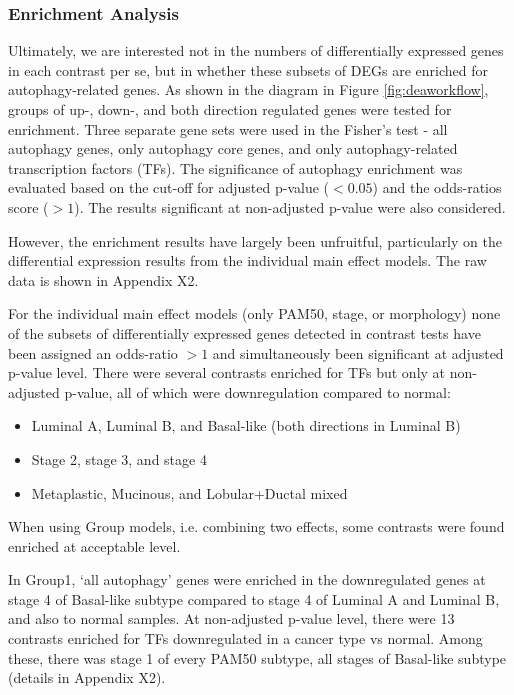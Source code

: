         \subsubsection{Enrichment Analysis}
        
        Ultimately, we are interested not in the numbers of differentially expressed genes in each contrast per se, but in whether these subsets of DEGs are enriched for autophagy-related genes. As shown in the diagram in Figure \ref{fig:deaworkflow}, groups of up-, down-, and both direction regulated genes were tested for enrichment. Three separate gene sets were used in the Fisher’s test - all autophagy genes, only autophagy core genes, and only autophagy-related transcription factors (TFs). The significance of autophagy enrichment was evaluated based on the cut-off for adjusted p-value ($<0.05$) and the odds-ratios score ($>1$). The results significant at non-adjusted p-value were also considered.

        However, the enrichment results have largely been unfruitful, particularly on the differential expression results from the individual main effect models. The raw data is shown in Appendix X2. 
        
        For the individual main effect models (only PAM50, stage, or morphology) none of the subsets of differentially expressed genes detected in contrast tests have been assigned an odds-ratio $>1$ and simultaneously been significant at adjusted p-value level. There were several contrasts enriched for TFs but only at non-adjusted p-value, all of which were downregulation compared to normal:
        
        \begin{itemize}
            \item Luminal A, Luminal B, and Basal-like  (both directions in Luminal B)
            \item Stage 2, stage 3, and stage 4 
            \item Metaplastic, Mucinous, and Lobular+Ductal mixed \\
        \end{itemize}
        
        \vspace{5mm}
        When using Group models, i.e. combining two effects, some contrasts were found enriched at acceptable level.
        
        In Group1, ‘all autophagy’ genes were enriched in the downregulated genes at stage 4 of Basal-like subtype compared to stage 4 of Luminal A and Luminal B, and also to normal samples. At non-adjusted p-value level, there were 13 contrasts enriched for TFs downregulated in a cancer type vs normal. Among these, there was stage 1 of every PAM50 subtype, all stages of Basal-like subtype (details in Appendix X2). 
         
